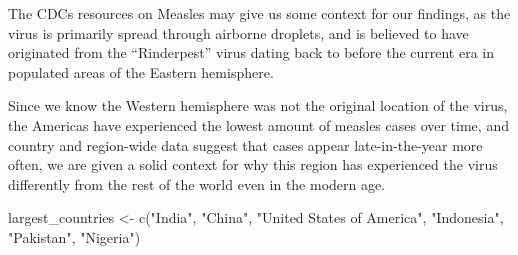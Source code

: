 \documentclass[
  letterpaper,
  DIV=11,
  numbers=noendperiod]{scrartcl}
\newenvironment{Shaded}{\begin{snugshade}}{\end{snugshade}}
\newcommand{\FunctionTok}[1]{\textcolor[rgb]{0.28,0.35,0.67}{#1}}
\newcommand{\NormalTok}[1]{\textcolor[rgb]{0.00,0.23,0.31}{#1}}
\newcommand{\OtherTok}[1]{\textcolor[rgb]{0.00,0.23,0.31}{#1}}
\newcommand{\StringTok}[1]{\textcolor[rgb]{0.13,0.47,0.30}{#1}}
\begin{document}
The CDCs resources on Measles may give us some context for our findings,
as the virus is primarily spread through airborne droplets, and is
believed to have originated from the ``Rinderpest'' virus dating back to
before the current era in populated areas of the Eastern hemisphere.

Since we know the Western hemisphere was not the original location of
the virus, the Americas have experienced the lowest amount of measles
cases over time, and country and region-wide data suggest that cases
appear late-in-the-year more often, we are given a solid context for why
this region has experienced the virus differently from the rest of the
world even in the modern age.

\begin{Shaded}
\begin{Highlighting}[]
\NormalTok{largest\_countries }\OtherTok{\textless{}{-}} \FunctionTok{c}\NormalTok{(}\StringTok{"India"}\NormalTok{,}
                       \StringTok{"China"}\NormalTok{,}
                       \StringTok{"United States of America"}\NormalTok{,}
                       \StringTok{"Indonesia"}\NormalTok{,}
                       \StringTok{"Pakistan"}\NormalTok{,}
                       \StringTok{"Nigeria"}\NormalTok{)}


\end{Highlighting}
\end{Shaded}
\end{document}
